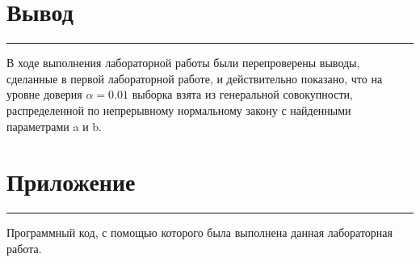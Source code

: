 \documentclass[a4paper, 14pt]{extarticle}
\begin{document}
\section*{Вывод}\vspace{-20pt}\rule{\linewidth}{0.1mm}

В ходе выполнения лабораторной работы были перепроверены выводы, 
сделанные в первой лабораторной работе, и действительно показано, 
что на уровне доверия $\alpha = 0.01$ выборка взята из генеральной совокупности, 
распределенной по непрерывному нормальному закону с найденными 
параметрами a и b.


\newpage

\section*{Приложение}\vspace{-20pt}\rule{\linewidth}{0.1mm}

Программный код, с помощью которого была выполнена данная лабораторная работа.\\
\end{document}
